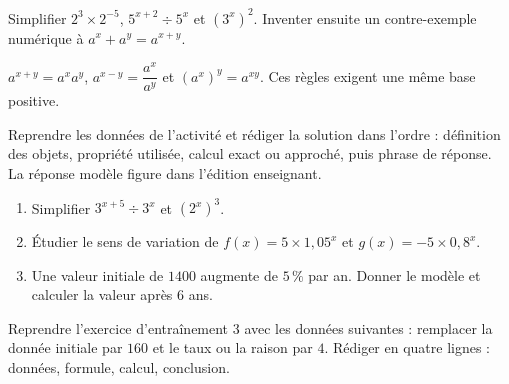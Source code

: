 \begin{activite}
Simplifier $2^3\times2^{-5}$, $5^{x+2}\div5^x$ et $(3^x)^2$. Inventer ensuite un contre-exemple numérique à $a^x+a^y=a^{x+y}$.

\end{activite}

\begin{traceecrite}$a^{x+y}=a^xa^y$, $a^{x-y}=\dfrac{a^x}{a^y}$ et $(a^x)^y=a^{xy}$. Ces règles exigent une même base positive.\end{traceecrite}

\begin{exemple}
Reprendre les données de l'activité et rédiger la solution dans l'ordre : définition des objets, propriété utilisée, calcul exact ou approché, puis phrase de réponse. La réponse modèle figure dans l'édition enseignant.
\end{exemple}

\begin{exercice}[-- essentiel]
\begin{enumerate}\item Simplifier $3^{x+5}\div3^x$ et $(2^x)^3$.\item Étudier le sens de variation de $f(x)=5\times1{,}05^x$ et $g(x)=-5\times0{,}8^x$.\item Une valeur initiale de $1400$ augmente de $5\,\%$ par an. Donner le modèle et calculer la valeur après $6$ ans.\end{enumerate}
\end{exercice}


\begin{dm}Reprendre l'exercice d'entraînement 3 avec les données suivantes : remplacer la donnée initiale par $160$ et le taux ou la raison par $4$. Rédiger en quatre lignes : données, formule, calcul, conclusion.\end{dm}

